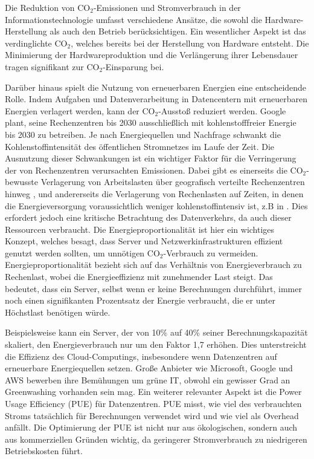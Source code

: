 \documentclass{article}
\begin{document}
Die Reduktion von CO$_2$-Emissionen und Stromverbrauch in der Informationstechnologie umfasst verschiedene Ansätze, die sowohl die Hardware-Herstellung als auch den Betrieb berücksichtigen. Ein wesentlicher Aspekt ist das verdinglichte CO$_2$, welches bereits bei der Herstellung von Hardware entsteht. Die Minimierung der Hardwareproduktion und die Verlängerung ihrer Lebensdauer tragen signifikant zur CO$_2$-Einsparung bei.

Darüber hinaus spielt die Nutzung von erneuerbaren Energien eine entscheidende Rolle. Indem Aufgaben und Datenverarbeitung in Datencentern mit erneuerbaren Energien verlagert werden, kann der CO$_2$-Ausstoß reduziert werden. Google plant, seine Rechenzentren bis 2030 ausschließlich mit kohlenstofffreier
Energie bis 2030 zu betreiben\cite{Google_2020}. 
Je nach Energiequellen und Nachfrage schwankt die Kohlenstoffintensität des öffentlichen Stromnetzes im Laufe der Zeit. Die Ausnutzung dieser Schwankungen ist ein wichtiger Faktor für die Verringerung der von Rechenzentren verursachten Emissionen. Dabei gibt es einerseits  die CO$_2$-bewusste Verlagerung von Arbeitslasten über geografisch verteilte Rechenzentren hinweg \cite{yang_carbon-neutralized_2022}, und andererseits  die  Verlagerung von Rechenlasten auf Zeiten, in denen die Energieversorgung voraussichtlich weniger kohlenstoffintensiv ist, z.B in  \cite{wiesner_lets_2021}.
Dies erfordert jedoch eine kritische Betrachtung des Datenverkehrs, da auch dieser Ressourcen verbraucht. Die Energieproportionalität \cite{abts_energy_2010, zheng_distributed_2022} ist hier ein wichtiges Konzept, welches besagt, dass Server und Netzwerkinfrastrukturen effizient genutzt werden sollten, um unnötigen CO$_2$-Verbrauch zu vermeiden. 
Energieproportionalität bezieht sich auf das Verhältnis von Energieverbrauch zu Rechenlast, wobei die Energieeffizienz mit zunehmender Last steigt. Das bedeutet, dass ein Server, selbst wenn er keine Berechnungen durchführt, immer noch einen signifikanten Prozentsatz der Energie verbraucht, die er unter Höchstlast benötigen würde.

Beispielsweise kann ein Server, der von 10\% auf 40\% seiner Berechnungskapazität skaliert, den Energieverbrauch nur um den Faktor 1,7 erhöhen. Dies unterstreicht die Effizienz des Cloud-Computings, insbesondere wenn Datenzentren auf erneuerbare Energiequellen setzen. Große Anbieter wie Microsoft, Google und AWS bewerben ihre Bemühungen um grüne IT, obwohl ein gewisser Grad an Greenwashing vorhanden sein mag. 
Ein weiterer relevanter Aspekt ist die Power Usage Efficiency (PUE) für Datenzentren. PUE misst, wie viel des verbrauchten Stroms tatsächlich für Berechnungen verwendet wird und wie viel als Overhead anfällt. Die Optimierung der PUE ist nicht nur aus ökologischen, sondern auch aus kommerziellen Gründen wichtig, da geringerer Stromverbrauch zu niedrigeren Betriebskosten führt.
\end{document}
